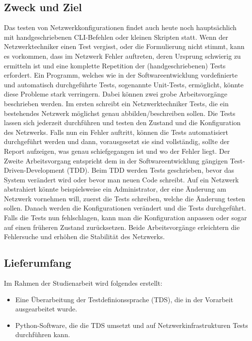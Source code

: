 \documentclass[
	ngerman,
	toc=listof, %
	toc=bibliography, %
	footnotes=multiple, %
	parskip=half, %
	numbers=noendperiod %
]{scrartcl}
\begin{document}
	\subsection{Zweck und Ziel}
		Das testen von Netzwerkkonfigurationen findet auch heute noch hauptsächlich mit handgeschriebenen CLI-Befehlen oder kleinen Skripten statt. 
		Wenn der Netzwerktechniker einen Test vergisst, oder die Formulierung nicht stimmt,	kann es vorkommen, dass im Netzwerk Fehler auftreten, deren Ursprung schwierig zu ermitteln ist und eine komplette Repetition der (handgeschriebenen) Tests erfordert. 
		Ein Programm, welches wie in der Softwareentwicklung vordefinierte und automatisch durchgeführte Tests, sogenannte Unit-Tests, ermöglicht, könnte diese Probleme stark verringern.
		Dabei können zwei grobe Arbeitsvorgänge beschrieben werden. 
		Im ersten schreibt ein Netzwerktechniker Tests, die ein bestehendes Netzwerk möglichst genau abbilden/beschreiben sollen.
		Die Tests lassen sich jederzeit durchführen und testen den Zustand und die Konfiguration des Netzwerks. 
		Falls nun ein Fehler auftritt, können die Tests automatisiert durchgeführt werden und dann, vorausgesetzt sie sind vollständig, sollte der Report aufzeigen, was genau schiefgegangen ist und wo der Fehler liegt.
		Der Zweite Arbeitsvorgang entspricht dem in der Softwareentwicklung gängigen Test-Driven-Development (TDD). 
		Beim TDD werden Tests geschrieben, bevor das System verändert wird oder bevor man neuen Code schreibt. 
		Auf ein Netzwerk abstrahiert könnte beispielsweise ein Administrator, der eine Änderung am Netzwerk vornehmen will, zuerst die Tests schreiben, welche die Änderung testen sollen. 
		Danach werden die Konfigurationen verändert und die Tests durchgeführt. 
		Falls die Tests nun fehlschlagen, kann man die Konfiguration anpassen oder sogar auf einen früheren Zustand zurücksetzen. 
		Beide Arbeitsvorgänge erleichtern die Fehlersuche und erhöhen die Stabilität des Netzwerks.	

	\subsection{Lieferumfang}
		Im Rahmen der Studienarbeit wird folgendes erstellt:
		\begin{itemize}
			\item Eine Überarbeitung der Testdefinionssprache (TDS), die in der Vorarbeit ausgearbeitet wurde.
			\item Python-Software, die die TDS umsetzt und auf Netzwerkinfrastrukturen Tests durchführen kann.
		\end{itemize}
\end{document}
